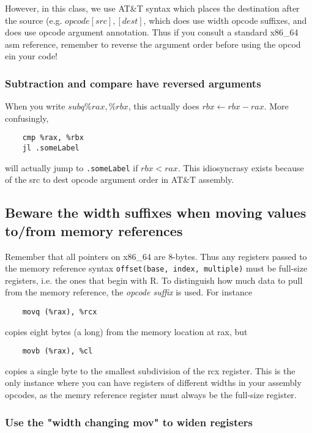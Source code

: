 \documentclass[11pt]{article}
\begin{document}
However, in this class, we use AT\&T syntax which places the destination after the source
(e.g. $opcode [src], [dest]$, which does use width opcode suffixes, and does use opcode
argument annotation. Thus if you consult a standard x86\_64 asm reference, remember to
reverse the argument order before using the opcod ein your code!

\subsubsection{Subtraction and compare have reversed arguments}

When you write $subq \%rax, \%rbx$, this actually does $rbx \leftarrow rbx - rax$. More
confusingly,

\begin{lstlisting}
    cmp %rax, %rbx
    jl .someLabel
\end{lstlisting}

will actually jump to \texttt{.someLabel} if $rbx < rax$. This idiosyncrasy exists because
of the src to dest opcode argument order in AT\&T assembly.

\subsection{Beware the width suffixes when moving values to/from memory references}

Remember that all pointers on x86\_64 are 8-bytes. Thus any registers passed to the memory
reference syntax \texttt{offset(base, index, multiple)} must be full-size registers, i.e.
the ones that begin with R. To distinguish how much data to pull from the memory
reference, the \emph{opcode suffix} is used. For instance

\begin{lstlisting}
    movq (%rax), %rcx
\end{lstlisting}

copies eight bytes (a  long) from the memory location at rax, but

\begin{lstlisting}
    movb (%rax), %cl
\end{lstlisting}

copies a single byte to the smallest subdivision of the rcx register. This is the only instance
where you can have registers of different widths in your assembly opcodes, as the memry
reference register must always be the full-size register.

\subsubsection{Use the "width changing mov" to widen registers}
\end{document}
